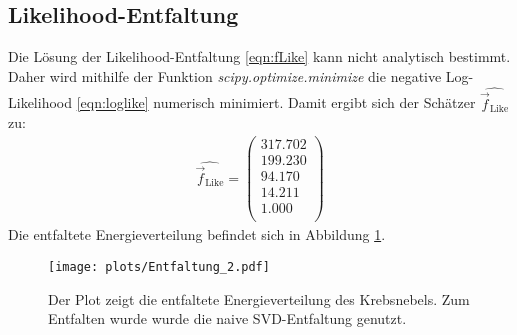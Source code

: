 \subsection{Likelihood-Entfaltung}
Die Lösung der Likelihood-Entfaltung \eqref{eqn:fLike} kann nicht analytisch bestimmt. Daher wird mithilfe der Funktion \textit{scipy.optimize.minimize} die negative Log-Likelihood \eqref{eqn:loglike} numerisch minimiert. Damit ergibt sich der Schätzer $\hat{\vec{f}_{\text{Like}}}$ zu:\\
\begin{align*}
	\hat{\vec{f}_{\text{Like}}} = \begin{pmatrix}
			317.702\\
			199.230\\
			94.170\\
			14.211\\
			1.000\\
	\end{pmatrix}
\end{align*}
Die entfaltete Energieverteilung befindet sich in Abbildung \ref{fig:E2}.
\begin{figure}
  \centering
  \texttt{[image: plots/Entfaltung\_2.pdf]}
  \caption{Der Plot zeigt die entfaltete Energieverteilung des Krebsnebels. Zum Entfalten wurde wurde die naive SVD-Entfaltung genutzt.}
  \label{fig:E2}
\end{figure}
